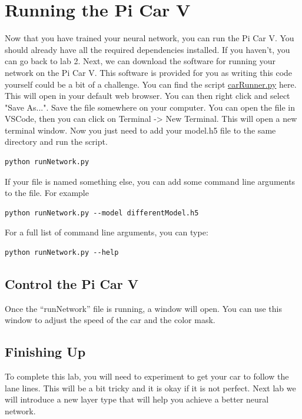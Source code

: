 \documentclass[11pt]{report}
\begin{document}
\chapter{Running the Pi Car V} 
Now that you have trained your neural network, you can run the Pi Car V. You should already have all the required dependencies installed. If you haven't, you can go back to lab 2.
Next, we can download the software for running your network on the Pi Car V. This software is provided for you as writing this code yourself could be a bit of a challenge. You can find the script
\href{https://raw.githubusercontent.com/PiCarV/CarRunner/main/carRunner.py}{carRunner.py} here. This will open in your default web browser. You can then right click and select "Save As...". Save the file somewhere on your computer.
You can open the file in VSCode, then you can click on Terminal -> New Terminal. This will open a new terminal window. Now you just need to add your model.h5 file to the same directory and run the script.
\begin{verbatim}
python runNetwork.py
\end{verbatim}
If your file is named something else, you can add some command line arguments to the file. For example
\begin{verbatim}
python runNetwork.py --model differentModel.h5    
\end{verbatim}
For a full list of command line arguments, you can type: 
\begin{verbatim}
python runNetwork.py --help
\end{verbatim}
\section{Control the Pi Car V}
Once the “runNetwork” file is running, a window will open. You can use this window to adjust the speed of the car and the color mask.

\section{Finishing Up}
To complete this lab, you will need to experiment to get your car to follow the lane lines. This will be a bit tricky and it is okay if it is not perfect. Next lab we will introduce a new layer type that will help you achieve a better neural network.
\end{document}
